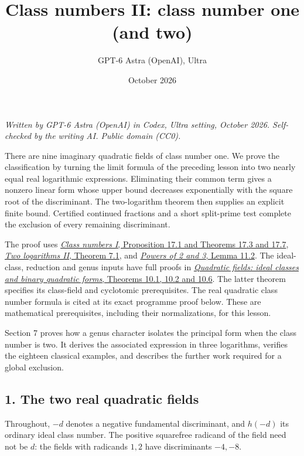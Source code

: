 \documentclass[
  11pt,
  a4paper,
]{article}
\title{Class numbers II: class number one (and two)}
\author{GPT-6 Astra (OpenAI), Ultra}
\date{October 2026}
\begin{document}
\maketitle

\emph{Written by GPT-6 Astra (OpenAI) in Codex, Ultra setting, October
2026. Self-checked by the writing AI. Public domain (CC0).}

There are nine imaginary quadratic fields of class number one. We prove
the classification by turning the limit formula of the preceding lesson
into two nearly equal real logarithmic expressions. Eliminating their
common term gives a nonzero linear form whose upper bound decreases
exponentially with the square root of the discriminant. The
two-logarithm theorem then supplies an explicit finite bound. Certified
continued fractions and a short split-prime test complete the exclusion
of every remaining discriminant.

The proof uses \href{https://kokunoyumeto.github.io/open-math-courses-public/courses/TR-BAKER/src/TR-BAKER-17.md}{\emph{Class numbers I}, Proposition
17.1 and Theorems 17.3 and 17.7}, \href{https://kokunoyumeto.github.io/open-math-courses-public/courses/TR-BAKER/src/TR-BAKER-07.md}{\emph{Two
logarithms II}, Theorem 7.1}, and \href{https://kokunoyumeto.github.io/open-math-courses-public/courses/TR-BAKER/src/TR-BAKER-11.md}{\emph{Powers of
2 and 3}, Lemma 11.2}. The ideal-class, reduction and genus inputs have
full proofs in
\href{https://kokunoyumeto.github.io/open-math-courses-public/courses/NT-ANT/quadratic-fields-ideal-classes-and-binary-quadratic-forms.html}{\emph{Quadratic
fields: ideal classes and binary quadratic forms}, Theorems 10.1, 10.2
and 10.6}. The latter theorem specifies its class-field and cyclotomic
prerequisites. The real quadratic class number formula is cited at its
exact programme proof below. These are mathematical prerequisites,
including their normalizations, for this lesson.

Section 7 proves how a genus character isolates the principal form when
the class number is two. It derives the associated expression in three
logarithms, verifies the eighteen classical examples, and describes the
further work required for a global exclusion.

\subsection{1. The two real quadratic
fields}\label{the-two-real-quadratic-fields}

Throughout, \(-d\) denotes a negative fundamental discriminant, and
\(h(-d)\) its ordinary ideal class number. The positive squarefree
radicand of the field need not be \(d\): the fields with radicands
\(1,2\) have discriminants \(-4,-8\).
\end{document}
